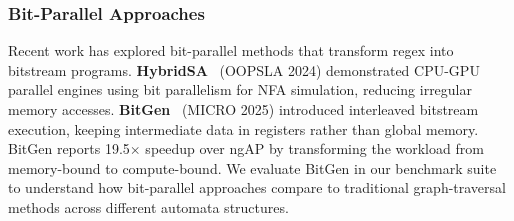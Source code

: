 \subsubsection{Bit-Parallel Approaches}
Recent work has explored bit-parallel methods that transform regex into bitstream programs.
\textbf{HybridSA}~\cite{hybridsa} (OOPSLA 2024) demonstrated CPU-GPU parallel engines using bit parallelism for NFA simulation, reducing irregular memory accesses.
\textbf{BitGen}~\cite{bitgen} (MICRO 2025) introduced interleaved bitstream execution, keeping intermediate data in registers rather than global memory. BitGen reports 19.5$\times$ speedup over ngAP by transforming the workload from memory-bound to compute-bound.
We evaluate BitGen in our benchmark suite to understand how bit-parallel approaches compare to traditional graph-traversal methods across different automata structures.
